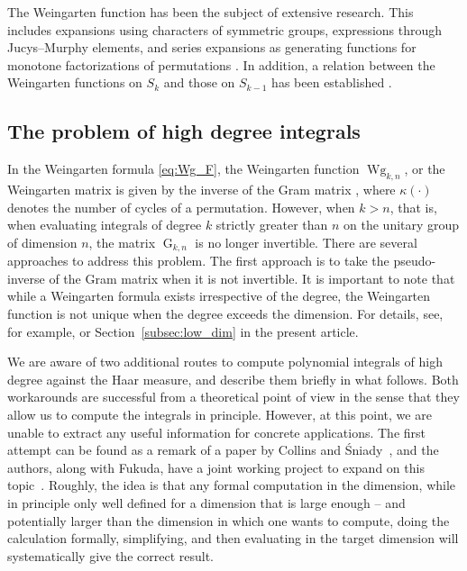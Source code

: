 \documentclass[10pt,a4paper]{amsart}
\numberwithin{equation}{section}
\theoremstyle{definition}
\DeclareMathOperator{\G}{G}
\DeclareMathOperator{\Wg}{Wg}
\begin{document}
The Weingarten function has been the subject of extensive research. This includes expansions using characters of symmetric groups, expressions through Jucys--Murphy elements, and series expansions as generating functions for monotone factorizations of permutations \cite{MatsumotoNovak, Novak2010}.
In addition, a relation between the Weingarten functions on $S_k$ and those on $S_{k-1}$ has been established \cite{CollinsMatsumoto2017}.

\subsection{The problem of high degree integrals}\label{sec:problem}

In the Weingarten formula \eqref{eq:Wg_F}, the Weingarten function $\Wg_{k,n}$, or
the Weingarten matrix \smash{$\bigl(\Wg_{k,n}\bigl(\sigma \tau^{-1}\bigr)\bigr)_{\sigma,\tau \in S_k}$}
is given by the inverse of the Gram matrix \smash{$\G_{k,n}=\bigl(n^{\kappa(\sigma\tau^{-1})}\bigr)_{\sigma,\tau \in S_k}$}, where $\kappa(\cdot)$ denotes the number of cycles of a permutation.
However, when $k>n$, that is, when evaluating integrals of degree $k$ strictly greater than $n$ on the unitary group of dimension $n$, the matrix $\G_{k,n}$ is no longer invertible. There are several approaches to address this problem. The first approach is to take the pseudo-inverse of the Gram matrix when it is not invertible. It is important to note that while a Weingarten formula exists irrespective of the degree, the Weingarten function is not unique when the degree exceeds the dimension. For details, see, for example, \cite{CMN} or
Section~\ref{subsec:low_dim} in the present article.

We are aware of two additional routes to compute polynomial integrals of high degree against the Haar measure, and describe them briefly in what follows. Both workarounds are successful from a theoretical point of view in the sense that they allow us to compute the integrals in principle. However, at this point, we are unable to extract any useful information for concrete applications.
The first attempt can be found as a remark of a paper by Collins and \'Sniady~\cite{CollinsSniady2006}, and the authors, along with Fukuda, have a joint working project to expand on this topic~\cite{CollinsFukudaMatsumoto}.
Roughly, the idea is that any formal computation in the dimension, while in principle only well defined for a dimension that is large enough -- and potentially larger than the dimension in which one wants to compute, doing the calculation formally, simplifying, and then evaluating in the target dimension will systematically give the correct result.
\end{document}
